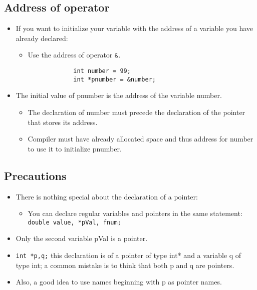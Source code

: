 \subsection{Address of operator}
\begin{itemize}
    \item If you want to initialize your variable with the address of a variable you have already declared:
        \begin{itemize}
            \item Use the address of operator \verb|&|.
        \end{itemize}
            \begin{verbatim}
                int number = 99;
                int *pnumber = &number; 
            \end{verbatim}
    
    \item The initial value of pnumber is the address of the variable number. 
        \begin{itemize}
            \item The declaration of number must precede the declaration of the pointer that stores its address.
            \item Compiler must have already allocated space and thus address for number to use it to initialize pnumber.
        \end{itemize}    
\end{itemize}

\subsection{Precautions}
\begin{itemize}
    \item There is nothing special about the declaration of a pointer: 
        \begin{itemize}
            \item You can declare regular variables and pointers in the same statement: \texttt{double value, *pVal, fnum;}
        \end{itemize}
    
    \item Only the second variable pVal is a pointer.
    \item \verb|int *p,q;| this declaration is of a pointer of type int* and a variable q of type int; a common mistake is to think that both p and q are pointers.
    \item Also, a good idea to use names beginning with p as pointer names. 
\end{itemize}

